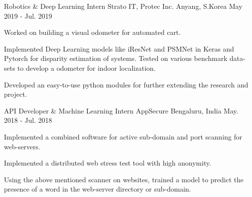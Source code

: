 

\begin{cventries}

  \cventry
    {Robotics \& Deep Learning Intern} %
    {Strato IT, Protec Inc.} %
    {Anyang, S.Korea} %
    {May 2019 - Jul. 2019} %
    {
      \begin{cvitems} %
        \item {Worked on building a visual odometer for automated cart.}
        \item {Implemented Deep Learning models like iResNet and PSMNet in Keras and Pytorch for disparity estimation of systems. Tested on various benchmark data-sets to develop a odometer for indoor localization.}
        \item {Developed an easy-to-use python modules for further extending the research and project.}
      \end{cvitems}
    }

  \cventry
    {API Developer \& Machine Learning Intern} %
    {AppSecure} %
    {Bengaluru, India} %
    {May. 2018 - Jul. 2018} %
    {
      \begin{cvitems} %
        \item {Implemented a combined software for active sub-domain and port scanning for web-servers.}
        \item {Implemented a distributed web stress test tool with high anonymity.}
        \item {Using the above mentioned scanner on websites, trained a model to predict the presence of a word in the web-server directory or sub-domain.}
      \end{cvitems}
    }

\end{cventries}
